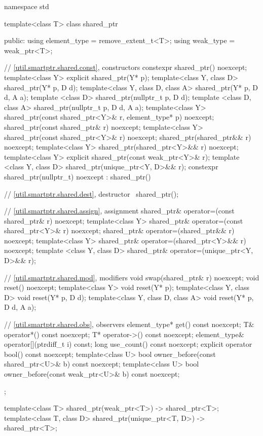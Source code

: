 \begin{codeblock}
namespace std {
  template<class T> class shared_ptr {
  public:
    using element_type = remove_extent_t<T>;
    using weak_type    = weak_ptr<T>;

    // \ref{util.smartptr.shared.const}, constructors
    constexpr shared_ptr() noexcept;
    template<class Y> explicit shared_ptr(Y* p);
    template<class Y, class D> shared_ptr(Y* p, D d);
    template<class Y, class D, class A> shared_ptr(Y* p, D d, A a);
    template <class D> shared_ptr(nullptr_t p, D d);
    template <class D, class A> shared_ptr(nullptr_t p, D d, A a);
    template<class Y> shared_ptr(const shared_ptr<Y>& r, element_type* p) noexcept;
    shared_ptr(const shared_ptr& r) noexcept;
    template<class Y> shared_ptr(const shared_ptr<Y>& r) noexcept;
    shared_ptr(shared_ptr&& r) noexcept;
    template<class Y> shared_ptr(shared_ptr<Y>&& r) noexcept;
    template<class Y> explicit shared_ptr(const weak_ptr<Y>& r);
    template <class Y, class D> shared_ptr(unique_ptr<Y, D>&& r);
    constexpr shared_ptr(nullptr_t) noexcept : shared_ptr() { }

    // \ref{util.smartptr.shared.dest}, destructor
    ~shared_ptr();

    // \ref{util.smartptr.shared.assign}, assignment
    shared_ptr& operator=(const shared_ptr& r) noexcept;
    template<class Y> shared_ptr& operator=(const shared_ptr<Y>& r) noexcept;
    shared_ptr& operator=(shared_ptr&& r) noexcept;
    template<class Y> shared_ptr& operator=(shared_ptr<Y>&& r) noexcept;
    template <class Y, class D> shared_ptr& operator=(unique_ptr<Y, D>&& r);

    // \ref{util.smartptr.shared.mod}, modifiers
    void swap(shared_ptr& r) noexcept;
    void reset() noexcept;
    template<class Y> void reset(Y* p);
    template<class Y, class D> void reset(Y* p, D d);
    template<class Y, class D, class A> void reset(Y* p, D d, A a);

    // \ref{util.smartptr.shared.obs}, observers
    element_type* get() const noexcept;
    T& operator*() const noexcept;
    T* operator->() const noexcept;
    element_type& operator[](ptrdiff_t i) const;
    long use_count() const noexcept;
    explicit operator bool() const noexcept;
    template<class U> bool owner_before(const shared_ptr<U>& b) const noexcept;
    template<class U> bool owner_before(const weak_ptr<U>& b) const noexcept;
  };

  template<class T> shared_ptr(weak_ptr<T>) -> shared_ptr<T>;
  template<class T, class D> shared_ptr(unique_ptr<T, D>) -> shared_ptr<T>;

}
\end{codeblock}
